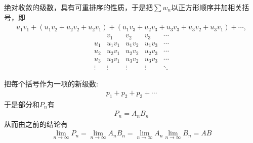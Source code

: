 \documentclass{article}
\begin{document}
绝对收敛的级数，具有可重排序的性质，于是把$\sum w_n$以正方形顺序并加相关括号，即
\begin{align*}
  u_1v_1 + (u_1v_2 + u_2v_2 + u_2v_1) + (u_1v_3 + u_2v_3 + u_3v_3 + u_3v_2 + u_3v_1) + \cdots,
\end{align*}
\[
  \begin{array}{c|cccc}
           & v_1     & v_2     & v_3     & \cdots \\
    \hline
    u_1    & u_1 v_1 & u_1 v_2 & u_1 v_3 & \cdots \\
    u_2    & u_2 v_1 & u_2 v_2 & u_2 v_3 & \cdots \\
    u_3    & u_3 v_1 & u_3 v_2 & u_3 v_3 & \cdots \\
    \vdots & \vdots  & \vdots  & \vdots  & \ddots
  \end{array}
\]

把每个括号作为一项的新级数:
\begin{align*}
  p_1 + p_2 + p_3 + \cdots
\end{align*}
于是部分和$P_n$有
\begin{align*}
  P_n = A_n B_n
\end{align*}
从而由之前的结论有
\begin{align*}
  \lim\limits_{n \to \infty} P_n
  = \lim\limits_{n \to \infty} A_n B_n
  = \lim\limits_{n \to \infty} A_n \lim\limits_{n \to \infty} B_n
  = AB
\end{align*}
\end{document}
